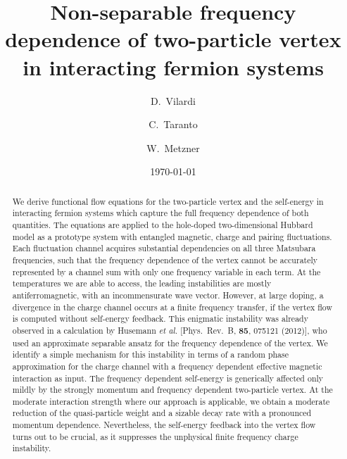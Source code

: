 \documentclass[aps,prb,twocolumn,showpacs,groupedaddress,
longbibliography]{revtex4-1}
\begin{document}
\title{Non-separable frequency dependence of two-particle vertex \\ 
        in interacting fermion systems}

\author {D.~Vilardi}
\author{C.~Taranto}
\author{W.~Metzner}

\date{\today}

\begin{abstract}
We derive functional flow equations for the two-particle vertex and the self-energy in interacting fermion systems which capture the full frequency dependence of both quantities. The equations are applied to the hole-doped two-dimensional Hubbard model as a prototype system with entangled magnetic, charge and pairing fluctuations. Each fluctuation channel acquires substantial dependencies on all three Matsubara frequencies, such that the frequency dependence of the vertex cannot be accurately represented by a channel sum with only one frequency variable in each term. At the temperatures we are able to access, the leading instabilities are mostly antiferromagnetic, with an incommensurate wave vector. However, at large doping, a divergence in the charge channel occurs at a finite frequency transfer, if the vertex flow is computed without self-energy feedback. This enigmatic instability was already observed in a calculation by Husemann \emph{et al.} [Phys.~Rev.~B, \textbf{85}, 075121 (2012)], who used an approximate separable ansatz for the frequency dependence of the vertex. We identify a simple mechanism for this instability in terms of a random phase approximation for the charge channel with a frequency dependent effective magnetic interaction as input.
The frequency dependent self-energy is generically affected only mildly by the strongly momentum and frequency dependent two-particle vertex. At the moderate interaction strength where our approach is applicable, we obtain a moderate reduction of the quasi-particle weight and a sizable decay rate with a pronounced momentum dependence. Nevertheless, the self-energy feedback into the vertex flow turns out to be crucial, as it suppresses the unphysical finite frequency charge instability.
\end{abstract}

\pacs{}
\maketitle
\end{document}
